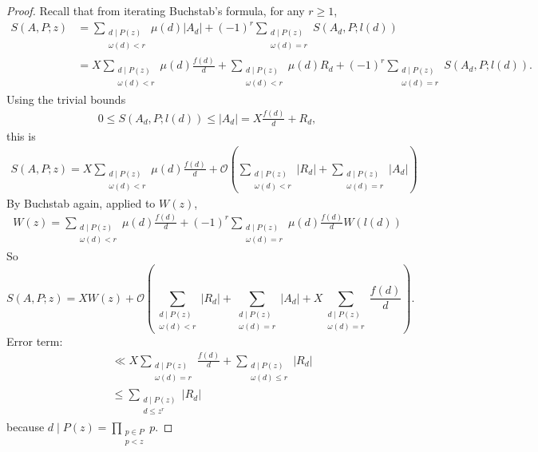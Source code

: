 \documentclass{article}
\newcommand{\1}{\mathbbm{1}}
\newcommand{\bigO}{\mathcal{O}}
\begin{document}
\begin{proof}
  Recall that from iterating Buchstab's formula, for any $r \geq 1$,
  \begin{align*}
    S(A,P;z) &= \sum_{\substack{d \mid P(z) \\ \omega(d) < r}} \mu(d) |A_d| + (-1)^r \sum_{\substack{d \mid P(z) \\ \omega(d)=r}} S(A_d, P; l(d)) \\
             &= X \sum_{\substack{d \mid P(z) \\ \omega(d) < r}} \mu(d) \frac{f(d)}{d} + \sum_{\substack{d \mid P(z) \\ \omega(d) < r}} \mu(d) R_d + (-1)^r \sum_{\substack{d \mid P(z) \\ \omega(d) = r}} S(A_d, P; l(d)).
  \end{align*}
  Using the trivial bounds
  \begin{align*}
    0 \leq S(A_d, P; l(d)) \leq |A_d| = X \frac{f(d)}{d} + R_d,
  \end{align*}
  this is
  \begin{align*}
    S(A,P;z) = X \sum_{\substack{d \mid P(z) \\ \omega(d) < r}} \mu(d) \frac{f(d)}{d} + \bigO\left(\sum_{\substack{d \mid P(z) \\ \omega(d) < r}} |R_d| + \sum_{\substack{d \mid P(z) \\ \omega(d) = r}} |A_d|\right)
  \end{align*}
  By Buchstab again, applied to $W(z)$,
  \begin{align*}
    W(z) = \sum_{\substack{d \mid P(z) \\ \omega(d) < r}} \mu(d) \frac{f(d)}{d} + (-1)^r \sum_{\substack{d \mid P(z) \\ \omega(d) = r}} \mu(d) \frac{f(d)}{d} W(l(d))
  \end{align*}
  So
  \begin{equation*}
    S(A,P;z) = XW(z) + \bigO\left(\sum_{\substack{d \mid P(z) \\ \omega(d) < r}} |R_d| + \sum_{\substack{d \mid P(z) \\ \omega(d) = r}} |A_d| + X \sum_{\substack{d \mid P(z) \\ \omega(d) = r}} \frac{f(d)}{d}\right).
  \end{equation*}
  Error term:
  \begin{align*}
    &\ll X \sum_{\substack{d \mid P(z) \\ \omega(d) = r}} \frac{f(d)}{d} + \sum_{\substack{d \mid P(z) \\ \omega(d) \leq r}} |R_d| \\
    &\leq \sum_{\substack{d \mid P(z) \\ d \leq z^r}} |R_d|
  \end{align*}
  because $d \mid P(z) = \prod_{\substack{p \in P \\ p < z}} p$.


\end{proof}
\end{document}
